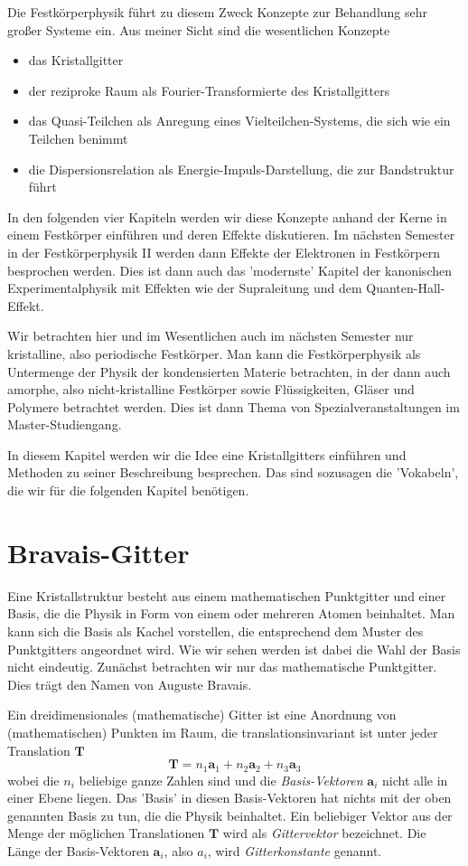 Die Festkörperphysik führt zu diesem Zweck Konzepte zur Behandlung sehr großer Systeme ein. Aus meiner Sicht sind die wesentlichen Konzepte 
\begin{itemize} \setlength{\itemsep}{0pt}
\item das {Kristallgitter}
\item der {reziproke Raum} als Fourier-Transformierte des Kristallgitters
\item das Quasi-Teilchen als Anregung eines Vielteilchen-Systems, die sich wie ein Teilchen benimmt
\item die Dispersionsrelation als Energie-Impuls-Darstellung, die zur Bandstruktur führt
\end{itemize}
In den folgenden vier Kapiteln werden wir diese Konzepte anhand der Kerne in einem Festkörper einführen und deren Effekte diskutieren. Im nächsten Semester in der Festkörperphysik II werden dann Effekte der Elektronen in Festkörpern besprochen werden. Dies ist dann auch das 'modernste' Kapitel der kanonischen Experimentalphysik mit Effekten wie der Supraleitung und dem Quanten-Hall-Effekt.

Wir betrachten hier und im Wesentlichen auch im nächsten Semester nur kristalline, also periodische Festkörper. Man kann die Festkörperphysik als Untermenge der Physik der kondensierten Materie betrachten, in der dann auch amorphe, also nicht-kristalline Festkörper sowie Flüssigkeiten, Gläser und Polymere betrachtet werden. Dies ist dann Thema von Spezialveranstaltungen im Master-Studiengang. 

In diesem Kapitel werden wir die Idee eine Kristallgitters einführen und Methoden zu seiner Beschreibung besprechen. Das sind sozusagen die 'Vokabeln', die wir für die folgenden Kapitel benötigen.


\section{Bravais-Gitter}

Eine Kristallstruktur besteht aus einem mathematischen Punktgitter und einer Basis,  die die Physik in Form von einem oder mehreren Atomen beinhaltet. Man kann sich die Basis als Kachel vorstellen, die entsprechend dem Muster des Punktgitters angeordnet wird. Wie wir sehen werden ist dabei die Wahl der Basis nicht eindeutig. Zunächst betrachten wir nur das mathematische Punktgitter. Dies trägt den Namen von Auguste Bravais.

Ein dreidimensionales (mathematische) Gitter ist eine Anordnung von (mathematischen) Punkten im Raum, die translationsinvariant ist unter jeder Translation $\mathbf{T}$
\begin{equation}
 \mathbf{T} = n_1 \mathbf{a}_1 + n_2 \mathbf{a}_2 + n_3 \mathbf{a}_3  
\end{equation}
wobei die $n_i$ beliebige ganze Zahlen sind und die \emph{Basis-Vektoren} $\mathbf{a}_i$ nicht alle in einer Ebene liegen. Das 'Basis' in diesen Basis-Vektoren hat nichts mit der oben genannten Basis zu tun, die die Physik beinhaltet. Ein beliebiger Vektor aus der Menge der möglichen Translationen $\mathbf{T}$ wird als \emph{Gittervektor} bezeichnet. Die Länge der Basis-Vektoren   $\mathbf{a}_i$, also  $a_i$, wird \emph{Gitterkonstante} genannt.

